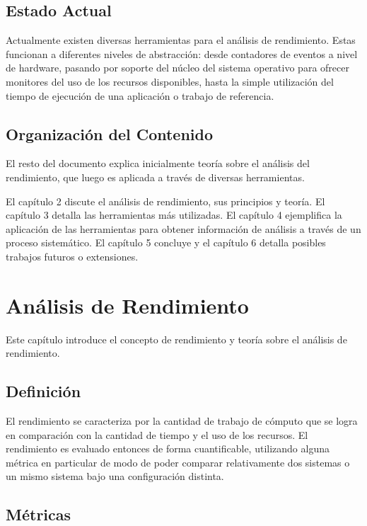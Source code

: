 \documentclass[a4paper]{report}
\begin{document}
\section{Estado Actual}

Actualmente existen diversas herramientas para el an\'alisis de rendimiento.
Estas funcionan a diferentes niveles de abstracci\'on: desde contadores de eventos
a nivel de hardware, pasando por soporte del n\'ucleo del sistema operativo para ofrecer
monitores del uso de los recursos disponibles, hasta la
simple utilizaci\'on del tiempo de ejecuci\'on de una aplicaci\'on o trabajo de referencia.

\section{Organizaci\'on del Contenido}

El resto del documento explica inicialmente teor\'ia sobre el an\'alisis del rendimiento, que luego es
aplicada a trav\'es de diversas herramientas.

\bigskip

El cap\'itulo 2 discute el an\'alisis de rendimiento, sus
principios y teor\'ia. El cap\'itulo 3 detalla las herramientas m\'as
utilizadas. El cap\'itulo 4 ejemplifica la aplicaci\'on de las herramientas
para obtener informaci\'on de an\'alisis a trav\'es de un proceso sistem\'atico.
El cap\'itulo 5 concluye y el cap\'itulo 6 detalla posibles trabajos futuros o extensiones.

\chapter{An\'alisis de Rendimiento}

Este cap\'itulo introduce el concepto de rendimiento y teor\'ia sobre el
an\'alisis de rendimiento.

\section{Definici\'on}

El rendimiento se caracteriza por la cantidad de trabajo de c\'omputo que se
logra en comparaci\'on con la cantidad de tiempo y el uso de los recursos.
El rendimiento es evaluado entonces de forma cuantificable, utilizando alguna
m\'etrica en particular de modo de poder comparar relativamente dos sistemas o
un mismo sistema bajo una configuraci\'on distinta.

\section{M\'etricas}
\end{document}

